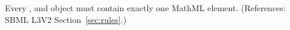 Every \AssignmentRule, \RateRule and \AlgebraicRule object must contain
exactly one MathML  element.  (References: SBML L3V2
Section~\ref{sec:rules}.)
